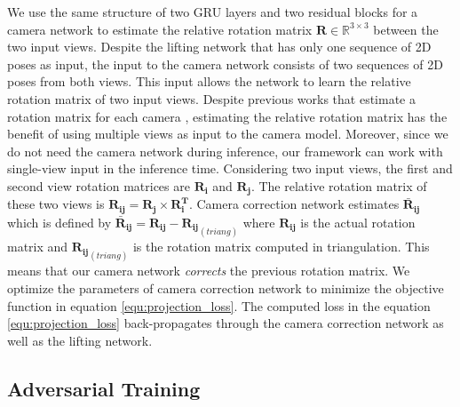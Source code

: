 \documentclass[10pt,twocolumn,letterpaper]{article}
\begin{document}
We use the same structure of two GRU layers and two residual blocks for a camera network to estimate the relative rotation matrix $\mathbf{R}\in \mathbb{R}^{3\times3}$ between the two input views. Despite the lifting network that has only one sequence of 2D poses as input, the input to the camera network consists of two sequences of 2D poses from both views. This input allows the network to learn the relative rotation matrix of two input views. Despite previous works that estimate a rotation matrix for each camera \cite{wandt2020canonpose}, estimating the relative rotation matrix has the benefit of using multiple views as input to the camera model. Moreover, since we do not need the camera network during inference, our framework can work with single-view input in the inference time. Considering two input views, the first and second view rotation matrices are $\mathbf{R_{i}}$ and $\mathbf{R_{j}}$. The relative rotation matrix of these two views is $\mathbf{R_{ij}}=\mathbf{R_{j}}\times\mathbf{R_{i}^T}$. Camera correction network estimates  $\mathbf{\bar{R}_{ij}}$ which is defined by $\mathbf{\bar{R}_{ij}}=\mathbf{R_{ij}}-\mathbf{R_{ij}}_{(triang)}$ where $\mathbf{R_{ij}}$ is the actual rotation matrix and $\mathbf{R_{ij}}_{(triang)}$ is the rotation matrix computed in triangulation. This means that our camera network \textit{corrects} the previous rotation matrix. We optimize the parameters of camera correction network to minimize the objective function in equation \ref{equ:projection_loss}. The computed loss in the equation \ref{equ:projection_loss} back-propagates through the camera correction network as well as the lifting network.   



\subsection{Adversarial Training}
\end{document}
